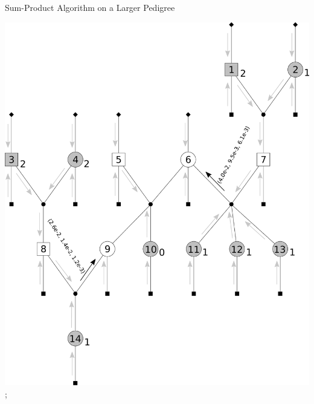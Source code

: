 \documentclass[letter,graphicx]{beamer}
\begin{document}
\begin{frame}{Sum-Product Algorithm on a Larger Pedigree} 
\begin{center} 
\includegraphics[height = 0.8\textheight]{./images/mg-example-step5.pdf}; 
\end{center}
\end{frame}
\end{document}
